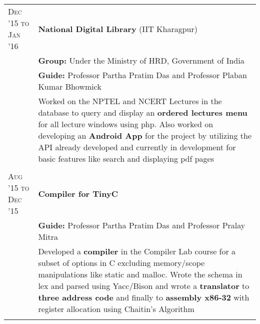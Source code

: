 \documentclass[a4paper,10pt]{extarticle} %
\begin{document}
\begin{tabular}{R{3.0cm}|p{15.0cm}}
\textsc{Dec '15 to Jan '16} & \textbf{National Digital Library} \textmd{(IIT Kharagpur)} \\
 & \textbf{Group: }\textmd{Under the Ministry of HRD}, Government of India\\
& \textbf{Guide: }\textmd{Professor Partha Pratim Das} and \textmd{Professor Plaban Kumar Bhowmick}\\
& \textmd{Worked on the NPTEL and NCERT Lectures in the database to query and display an \textbf{ordered lectures menu} for all lecture windows using php. Also worked on developing an \textbf{Android App} for the project by utilizing the API already developed and currently in development for basic features like search and displaying pdf pages}\\
 \\

\textsc{Aug '15 to Dec '15} & \textbf{Compiler for TinyC}\\
& \textbf{Guide: }\textmd{Professor Partha Pratim Das and Professor Pralay Mitra}\\
& \textmd{Developed a \textbf{compiler} in the Compiler Lab course for a subset of options in C excluding memory/scope manipulations like static and malloc. Wrote the schema in lex and parsed using Yacc/Bison and wrote a \textbf{translator} to \textbf{three address code} and finally to \textbf{assembly x86-32} with register allocation using Chaitin’s Algorithm}\\
 \\


\end{tabular}
\end{document}
